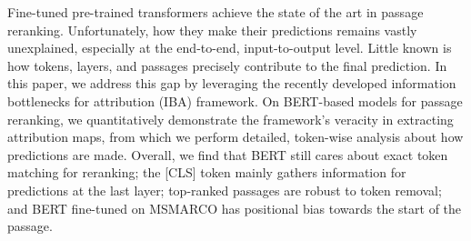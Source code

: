 Fine-tuned pre-trained transformers achieve the state of the art in passage reranking. Unfortunately, how they make their predictions remains vastly unexplained, especially at the end-to-end, input-to-output level. Little known is how tokens, layers, and passages precisely contribute to the final prediction. In this paper, we address this gap by leveraging the recently developed information bottlenecks for attribution (IBA) framework. On BERT-based models for passage reranking, we quantitatively demonstrate the framework's veracity in extracting attribution maps, from which we perform detailed, token-wise analysis about how predictions are made. Overall, we find that BERT still cares about exact token matching for reranking; the [CLS] token mainly gathers information for predictions at the last layer;  top-ranked passages are robust to token removal; and BERT fine-tuned on MSMARCO has positional bias towards the start of the passage.
